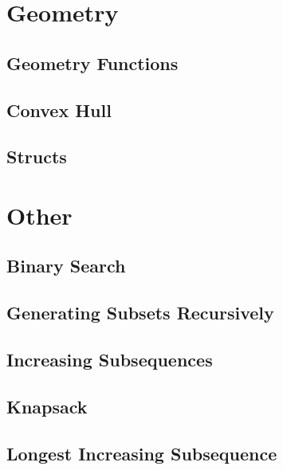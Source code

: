 \documentclass[twocolumn]{article}
\begin{document}
\section{Geometry}
\subsection{Geometry Functions}
\raggedbottom
\hrulefill
\subsection{Convex Hull}
\raggedbottom
\hrulefill
\subsection{Structs}
\raggedbottom
\hrulefill

\section{Other}
\subsection{Binary Search}
\raggedbottom
\hrulefill
\subsection{Generating Subsets Recursively}
\raggedbottom
\hrulefill
\subsection{Increasing Subsequences}
\raggedbottom
\hrulefill
\subsection{Knapsack}
\raggedbottom
\hrulefill
\subsection{Longest Increasing Subsequence}
\raggedbottom
\hrulefill
\end{document}
